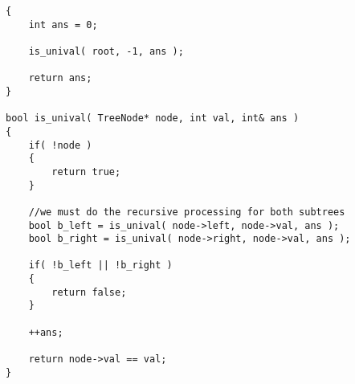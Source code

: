 \begin{lstlisting}[style=customc,caption={More Efficient Recursive Approach}]
{
    int ans = 0;

    is_unival( root, -1, ans );

    return ans;
}

bool is_unival( TreeNode* node, int val, int& ans )
{
    if( !node )
    {
        return true;
    }

    //we must do the recursive processing for both subtrees
    bool b_left = is_unival( node->left, node->val, ans );
    bool b_right = is_unival( node->right, node->val, ans );

    if( !b_left || !b_right )
    {
        return false;
    }

    ++ans;

    return node->val == val;
}
\end{lstlisting}